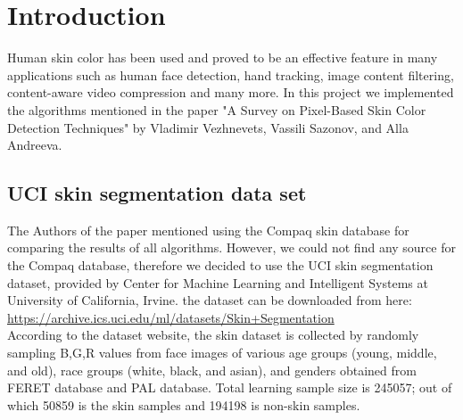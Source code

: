\documentclass[12pt]{article} %
\begin{document}

 \tableofcontents %

\newpage %

\section{Introduction} %

Human skin color has been used and proved to be an effective feature in many applications such as human face detection, hand tracking, image content filtering, content-aware video compression and many more. In this project we implemented the algorithms mentioned in the paper "A Survey on Pixel-Based Skin Color Detection Techniques" by Vladimir Vezhnevets, Vassili Sazonov, and Alla Andreeva.

\subsection{UCI skin segmentation data set}

The Authors of the paper mentioned using the Compaq skin database for comparing the results of all algorithms. However, we could not find any source for the Compaq database, therefore we decided to use the UCI skin segmentation dataset, provided by Center for Machine Learning and Intelligent Systems at University of California, Irvine. the dataset can be downloaded from here:
\href{https://archive.ics.uci.edu/ml/datasets/Skin+Segmentation}{https://archive.ics.uci.edu/ml/datasets/Skin+Segmentation} \\

According to the dataset website, the skin dataset is collected by randomly sampling B,G,R values from face images of various age groups (young, middle, and old), race groups (white, black, and asian), and genders obtained from FERET database and PAL database. Total learning sample size is 245057; out of which 50859 is the skin samples and 194198 is non-skin samples.\\
\end{document}
